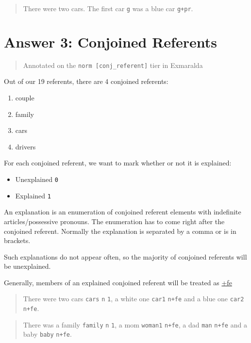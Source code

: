 \documentclass[
]{book}
\providecommand{\tightlist}{%
  \setlength{\itemsep}{0pt}\setlength{\parskip}{0pt}}
\begin{document}
\begin{quote}
There were two cars.
The first car \texttt{g} was a blue car \texttt{g+pr}.
\end{quote}

\hypertarget{answer-3-conjoined-referents}{%
\chapter{Answer 3: Conjoined Referents}\label{answer-3-conjoined-referents}}

\begin{quote}
Annotated on the \texttt{norm\ {[}conj\_referent{]}} tier in Exmaralda
\end{quote}

Out of our 19 referents, there are 4 conjoined referents:

\begin{enumerate}
\def\labelenumi{\arabic{enumi}.}
\tightlist
\item
  couple
\item
  family
\item
  cars
\item
  drivers
\end{enumerate}

For each conjoined referent, we want to mark whether or not it is explained:

\begin{itemize}
\tightlist
\item
  Unexplained \texttt{0}
\item
  Explained \texttt{1}
\end{itemize}

An explanation is an enumeration of conjoined referent elements with indefinite articles/possessive pronouns.
The enumeration has to come right after the conjoined referent.
Normally the explanation is separated by a comma or is in brackets.

Such explanations do not appear often, so the majority of conjoined referents will be unexplained.

Generally, members of an explained conjoined referent will be treated as \protect\hyperlink{further-explanation}{+fe}

\begin{quote}
There were two cars \texttt{cars} \texttt{n} \texttt{1}, a white one \texttt{car1} \texttt{n+fe} and a blue one \texttt{car2} \texttt{n+fe}.
\end{quote}

\begin{quote}
There was a family \texttt{family} \texttt{n} \texttt{1}, a mom \texttt{woman1} \texttt{n+fe}, a dad \texttt{man} \texttt{n+fe} and a baby \texttt{baby} \texttt{n+fe}.
\end{quote}
\end{document}
